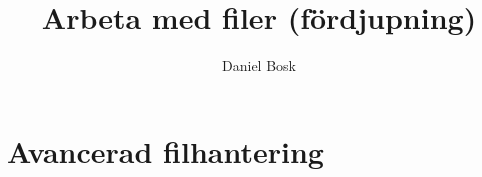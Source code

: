 \documentclass[a4paper,10pt,oneside,openright,
               oldfontcommands]{memoir}
\begin{document}
\title{%
  Arbeta med filer (fördjupning)
}
\author{Daniel Bosk}

\maketitle

\begin{abstract}
  
\end{abstract}

\clearpage

\tableofcontents*

\chapter{Avancerad filhantering}



\printbibliography
\end{document}
